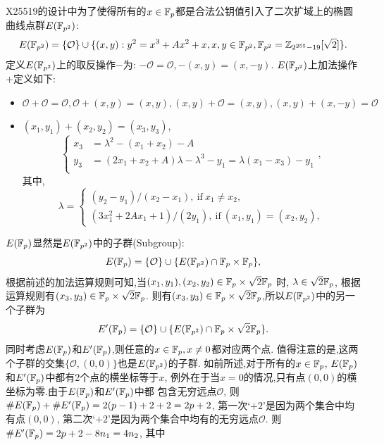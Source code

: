 X25519的设计中为了使得所有的$x\in\mathbb{F}_p$都是合法公钥值引入了二次扩域上的椭圆曲线点群$E(\mathbb{F}_{p^2})$:
$$E(\mathbb{F}_{p^2}) = \{ \mathcal{O} \}  \cup \{ (x,y): y^2 = x^3 + Ax^2 + x,  x, y \in \mathbb{F}_{p^2}, \mathbb{F}_{p^2} = \mathbb{Z}_{2^{255}-19}[\sqrt{2}] \}.$$
定义$E(\mathbb{F}_{p^2})$上的取反操作$-$为: $-\mathcal{O} = \mathcal{O}, -(x,y) = (x,-y)$.
$E(\mathbb{F}_{p^2})$上加法操作$+$定义如下:
\begin{itemize}
\item $\mathcal{O} + \mathcal{O} = \mathcal{O}, \mathcal{O} + (x,y) = (x,y), 
(x,y) + \mathcal{O} = (x,y), (x,y) + (x,-y) = \mathcal{O}$
\item $(x_1, y_1) + (x_2, y_2) = (x_3, y_3)$,
\begin{equation*}
\left\{
\begin{array}{ll}
x_3 & = \lambda^2 - (x_1 + x_2) - A\\
y_3 & = (2x_1 + x_2 + A)\lambda - \lambda^3 - y_1 = \lambda(x_1 - x_3) - y_1\\
\end{array},
\right.
\end{equation*}
其中,
\begin{equation*}
\lambda = 
\left\{
\begin{array}{ll}
(y_2-y_1) / (x_2-x_1),\ \text{if}\ x_1 \neq x_2,\\
(3x_1^2 + 2Ax_1 + 1) / (2y_1),\ \text{if}\ (x_1,y_1) =(x_2,y_2),
\end{array}
\right.
\end{equation*}
\end{itemize}
$E(\mathbb{F}_{p})$显然是$E(\mathbb{F}_{p^2})$中的子群(Subgroup):
$$E(\mathbb{F}_{p}) = \{ \mathcal{O} \} \cup \{ E(\mathbb{F}_{p^2}) \cap \mathbb{F}_p \times \mathbb{F}_p\},$$
根据前述的加法运算规则可知,当$(x_1, y_1), (x_2, y_2) \in  \mathbb{F}_p \times \sqrt{2}\mathbb{F}_{p}$ 时,
$\lambda \in \sqrt{2}\mathbb{F}_p$, 根据运算规则有$(x_3, y_3) \in  \mathbb{F}_p \times \sqrt{2}\mathbb{F}_{p}$.
则有$(x_3, y_3) \in  \mathbb{F}_p \times \sqrt{2}\mathbb{F}_{p}$,所以$E(\mathbb{F}_{p^2})$中的另一个子群为
$$E'(\mathbb{F}_{p}) = \{ \mathcal{O} \} \cup \{ E(\mathbb{F}_{p^2}) \cap \mathbb{F}_p \times \sqrt{2}\mathbb{F}_{p}\}.$$
同时考虑$E(\mathbb{F}_{p})$和$E'(\mathbb{F}_{p})$,则任意的$x\in\mathbb{F}_p, x \neq 0$都对应两个点.
值得注意的是,这两个子群的交集$\{ \mathcal{O}, (0,0) \}$也是$E(\mathbb{F}_{p^2})$的子群.
如前所述,对于所有的$x\in\mathbb{F}_p$,  $E(\mathbb{F}_{p})$和$E'(\mathbb{F}_{p})$中都有2个点的横坐标等于$x$,
例外在于当$x=0$的情况,只有点$(0,0)$的横坐标为零.由于$E(\mathbb{F}_{p})$和$E'(\mathbb{F}_{p})$中都
包含无穷远点$\mathcal{O}$, 则 $\#E(\mathbb{F}_{p})+\#E'(\mathbb{F}_{p}) = 2(p-1) + 2 + 2 = 2p + 2$,
第一次`$+2$'是因为两个集合中均有点$(0,0)$, 第二次`$+2$'是因为两个集合中均有的无穷远点$\mathcal{O}$.
则$\#E'(\mathbb{F}_p) = 2p + 2 - 8n_1 = 4n_2$, 其中
